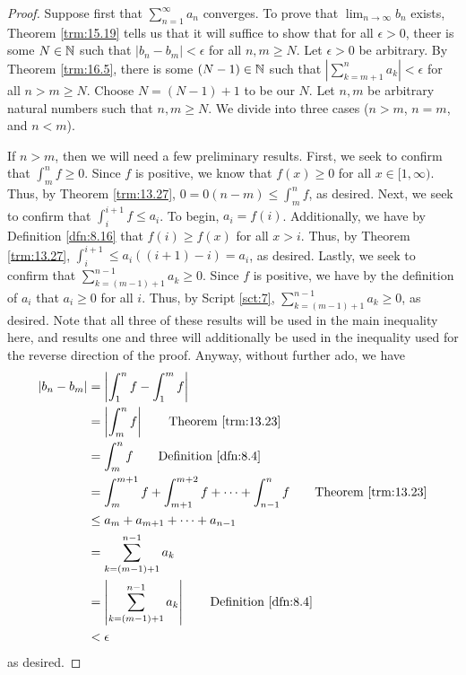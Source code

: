 \documentclass[../main.tex]{subfiles}
\begin{document}
\begin{enumerate}
\begin{proof}
        Suppose first that $\sum_{n=1}^\infty a_n$ converges. To prove that $\lim_{n\to\infty}b_n$ exists, Theorem \ref{trm:15.19} tells us that it will suffice to show that for all $\epsilon>0$, theer is some $N\in\mathbb{N}$ such that $|b_n-b_m|<\epsilon$ for all $n,m\geq N$. Let $\epsilon>0$ be arbitrary. By Theorem \ref{trm:16.5}, there is some $(N-1)\in\mathbb{N}$ such that $|\sum_{k=m+1}^na_k|<\epsilon$ for all $n>m\geq N$. Choose $N=(N-1)+1$ to be our $N$. Let $n,m$ be arbitrary natural numbers such that $n,m\geq N$. We divide into three cases ($n>m$, $n=m$, and $n<m$).\par
        If $n>m$, then we will need a few preliminary results. First, we seek to confirm that $\int_m^nf\geq 0$. Since $f$ is positive, we know that $f(x)\geq 0$ for all $x\in[1,\infty)$. Thus, by Theorem \ref{trm:13.27}, $0=0(n-m)\leq\int_m^nf$, as desired. Next, we seek to confirm that $\int_i^{i+1}f\leq a_i$. To begin, $a_i=f(i)$. Additionally, we have by Definition \ref{dfn:8.16} that $f(i)\geq f(x)$ for all $x>i$. Thus, by Theorem \ref{trm:13.27}, $\int_i^{i+1}\leq a_i((i+1)-i)=a_i$, as desired. Lastly, we seek to confirm that $\sum_{k=(m-1)+1}^{n-1}a_k\geq 0$. Since $f$ is positive, we have by the definition of $a_i$ that $a_i\geq 0$ for all $i$. Thus, by Script \ref{sct:7}, $\sum_{k=(m-1)+1}^{n-1}a_k\geq 0$, as desired. Note that all three of these results will be used in the main inequality here, and results one and three will additionally be used in the inequality used for the reverse direction of the proof. Anyway, without further ado, we have
        \begingroup
        \allowdisplaybreaks
        \begin{align*}
            |b_n-b_m| &= \left| \int_1^nf-\int_1^mf \right|\\
            &= \left| \int_m^nf \right|\tag*{Theorem \ref{trm:13.23}}\\
            &= \int_m^nf\tag*{Definition \ref{dfn:8.4}}\\
            &= \int_m^{m+1}f+\int_{m+1}^{m+2}f+\cdots+\int_{n-1}^nf\tag*{Theorem \ref{trm:13.23}}\\
            &\leq a_m+a_{m+1}+\cdots+a_{n-1}\\
            &= \sum_{k=(m-1)+1}^{n-1}a_k\\
            &= \left| \sum_{k=(m-1)+1}^{n-1}a_k \right|\tag*{Definition \ref{dfn:8.4}}\\
            &< \epsilon
        \end{align*}
        \endgroup
        as desired.\par

\end{proof}
\end{enumerate}
\end{document}
